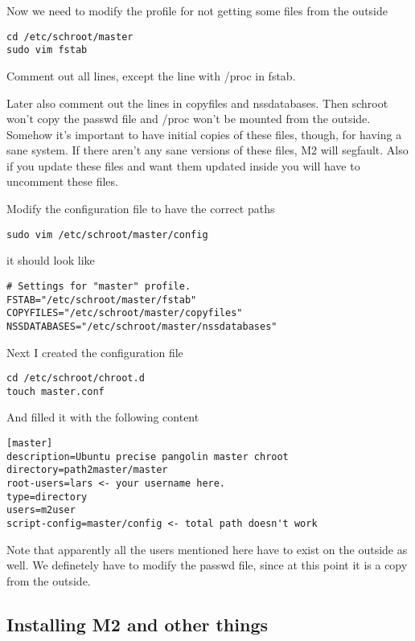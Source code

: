 \documentclass[a4paper]{book}
\begin{document}
Now we need to modify the profile for not getting some files from the outside

\begin{verbatim}
cd /etc/schroot/master
sudo vim fstab
\end{verbatim}

Comment out all lines, except the line with /proc in fstab. 

Later also comment out the lines in copyfiles and nssdatabases.  Then schroot
won't copy the passwd file and /proc won't be mounted from the outside.
Somehow it's important to have initial copies of these files, though, for
having a sane system. If there aren't any sane versions of these files, M2 will
segfault.  Also if you update these files and want them updated inside you will
have to uncomment these files.

Modify the configuration file to have the correct paths

\begin{verbatim}
sudo vim /etc/schroot/master/config
\end{verbatim}

it should look like

\begin{verbatim}
# Settings for "master" profile.
FSTAB="/etc/schroot/master/fstab"
COPYFILES="/etc/schroot/master/copyfiles"
NSSDATABASES="/etc/schroot/master/nssdatabases"
\end{verbatim}

Next I created the configuration file

\begin{verbatim}
cd /etc/schroot/chroot.d
touch master.conf
\end{verbatim}

And filled it with the following content

\begin{verbatim}
[master]
description=Ubuntu precise pangolin master chroot
directory=path2master/master
root-users=lars <- your username here.
type=directory
users=m2user
script-config=master/config <- total path doesn't work
\end{verbatim}

Note that apparently all the users mentioned here have to exist on the outside
as well.  We definetely have to modify the passwd file, since at this point it
is a copy from the outside.

\subsection{Installing M2 and other things}
\end{document}
